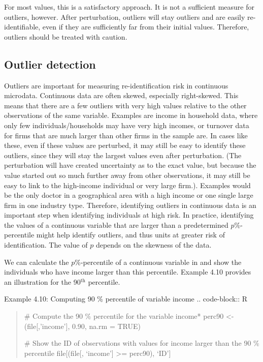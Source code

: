 \documentclass[letterpaper,10pt,english]{sphinxmanual}
\begin{document}
For most values, this is a satisfactory approach. It is not a sufficient
measure for outliers, however. After perturbation, outliers will stay
outliers and are easily re-identifiable, even if they are sufficiently
far from their initial values. Therefore, outliers should be treated
with caution.


\subsection{Outlier detection}
\label{\detokenize{measure_risk:outlier-detection}}
Outliers are important for measuring re-identification risk in
continuous microdata. Continuous data are often skewed, especially
right-skewed. This means that there are a few outliers with very high
values relative to the other observations of the same variable. Examples
are income in household data, where only few individuals/households may
have very high incomes, or turnover data for firms that are much larger
than other firms in the sample are. In cases like these, even if these
values are perturbed, it may still be easy to identify these outliers,
since they will stay the largest values even after perturbation. (The
perturbation will have created uncertainty as to the exact value, but
because the value started out so much further away from other
observations, it may still be easy to link to the high-income individual
or very large firm.). Examples would be the only doctor in a
geographical area with a high income or one single large firm in one
industry type. Therefore, identifying outliers in continuous data is an
important step when identifying individuals at high risk. In practice,
identifying the values of a continuous variable that are larger than a
predetermined \(p\%\)-percentile might help identify outliers, and
thus units at greater risk of identification. The value of \(p\)
depends on the skewness of the data.

We can calculate the \(p\%\)-percentile of a continuous variable in
 and show the individuals who have income larger than this
percentile. Example 4.10 provides an illustration for the 90$^{\text{th}}$
percentile.

Example 4.10: Computing 90 \% percentile of variable income
.. code-block:: R
\begin{quote}

\# Compute the 90 \% percentile for the variable income*
perc90 \textless{}- (file{[},’income’{]}, 0.90, na.rm = TRUE)

\# Show the ID of observations with values for income larger than the 90 \% percentile
file{[}(file{[}, ‘income’{]} \textgreater{}= perc90), ‘ID’{]}
\end{quote}
\end{document}
